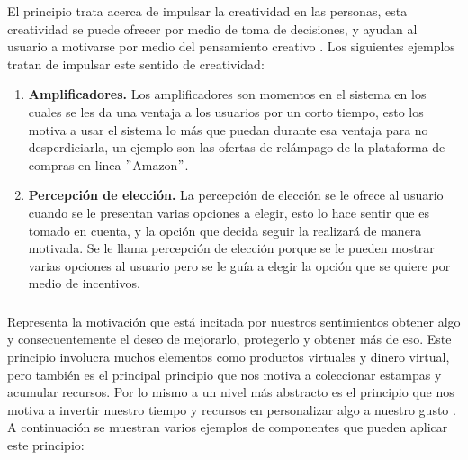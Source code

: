     El principio trata acerca de impulsar la creatividad en las personas, esta creatividad se puede ofrecer por medio de toma de decisiones, y ayudan al usuario a motivarse por medio del pensamiento creativo \cite[p. 126]{libro2}. Los siguientes ejemplos tratan de impulsar este sentido de creatividad:
    
    \begin{enumerate}
        \item \textbf{Amplificadores.} \cite[p. 146]{libro2} Los amplificadores son momentos en el sistema en los cuales se les da una ventaja a los usuarios por un corto tiempo, esto los motiva a usar el sistema lo más que puedan durante esa ventaja para no desperdiciarla, un ejemplo son las ofertas de relámpago de la plataforma de compras en linea $"$Amazon$"$.
        
        \item \textbf{Percepción de elección.} \cite[p. 150]{libro2} La percepción de elección se le ofrece al usuario cuando se le presentan varias opciones a elegir, esto lo hace sentir que es tomado en cuenta, y la opción que decida seguir la realizará de manera motivada. Se le llama percepción de elección porque se le pueden mostrar varias opciones al usuario pero se le guía a elegir la opción que se quiere por medio de incentivos.
    \end{enumerate}
    
    \subsubsection{\principioIV}
    \label{subsec:principioIV}
    
    Representa la motivación que está incitada por nuestros sentimientos obtener algo y consecuentemente el deseo de mejorarlo, protegerlo y obtener más de eso. Este principio involucra muchos elementos como productos virtuales  y dinero virtual, pero también es el principal principio que nos motiva a coleccionar estampas y acumular recursos. Por lo mismo a un nivel más abstracto es el principio que nos motiva a invertir nuestro tiempo y recursos en personalizar algo a nuestro gusto \cite[p. 161]{libro2}. A continuación se muestran varios ejemplos de componentes que pueden aplicar este principio:
    
